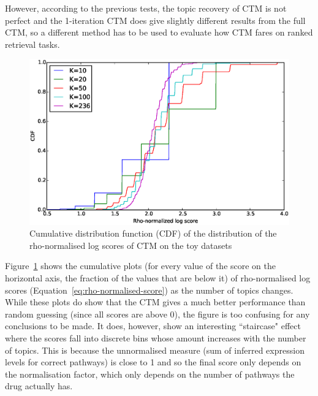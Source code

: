 \documentclass[12pt,a4paper,twoside,openright]{report}
\begin{document}
However, according to the previous tests, the topic recovery of CTM is not perfect and the 1-iteration CTM does give slightly different results from the full CTM, so a different method has to be used to evaluate how CTM fares on ranked retrieval tasks.

\begin{figure}[!htb]
\includegraphics[width=\textwidth]{sim-log.eps}
\caption{Cumulative distribution function (CDF) of the distribution of the rho-normalised log scores of CTM on the toy datasets}
\label{fig:sim-log}
\end{figure}

Figure~\ref{fig:sim-log} shows the cumulative plots (for every value of the score on the horizontal axis, the fraction of the values that are below it) of rho-normalised log scores (Equation~\ref{eq:rho-normalised-score}) as the number of topics changes. While these plots do show that the CTM gives a much better performance than random guessing (since all scores are above 0), the figure is too confusing for any conclusions to be made. It does, however, show an interesting ``staircase" effect where the scores fall into discrete bins whose amount increases with the number of topics. This is because the unnormalised measure (sum of inferred expression levels for correct pathways) is close to 1 and so the final score only depends on the normalisation factor, which only depends on the number of pathways the drug actually has.
\end{document}
